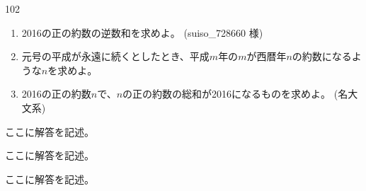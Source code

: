 \begin{thm}{102}{}{}
 \begin{enumerate}
  \item 2016の正の約数の逆数和を求めよ。  (suiso\_728660 様)
  \item 元号の平成が永遠に続くとしたとき、平成$m$年の$m$が西暦年$n$の約数になるような$n$を求めよ。 
  \item 2016の正の約数$n$で、$n$の正の約数の総和が2016になるものを求めよ。  (名大 文系)
 \end{enumerate}
\end{thm}

ここに解答を記述。

ここに解答を記述。

ここに解答を記述。
